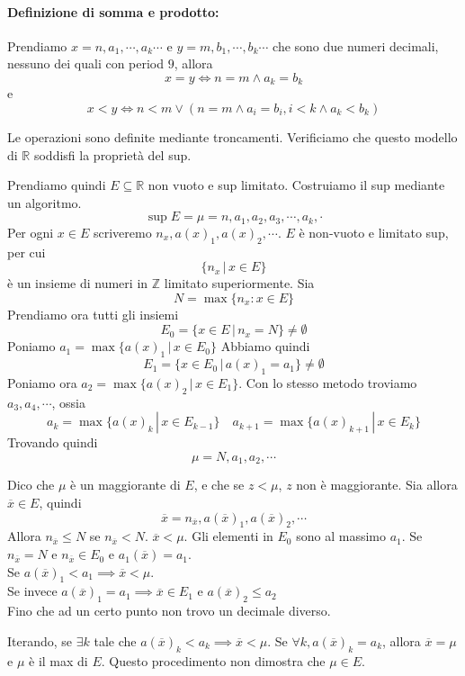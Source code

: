 \documentclass[a4paper]{article}
\begin{document}
\paragraph{Definizione di somma e prodotto:}

Prendiamo \(x = n,a_1,\cdots,a_k\cdots\) e \(y = m,b_1,\cdots,b_k\cdots\)
che sono due numeri decimali, nessuno dei quali con period \(9\),
allora
\[
    x=y \iff n=m \land a_k=b_k
\]
e
\[
    x<y \iff n < m \lor (n=m \land a_i = b_i, i < k \land a_k < b_k)
\]

Le operazioni sono definite mediante troncamenti.
Verificiamo che questo modello di \(\mathbb{R}\) soddisfi la proprietà del sup.

Prendiamo quindi  \(E\subseteq \mathbb{R}\) non vuoto e sup limitato. Costruiamo
il sup mediante un algoritmo.
\[
    \sup E = \mu = n,a_1,a_2,a_3,\cdots,a_k,\cdot
\]
Per ogni \(x\in E\) scriveremo \(n_x,a(x)_1, a(x)_2,\cdots\).
\(E\) è non-vuoto e limitato sup, per cui
\[
    \{ n_x \,|\, x\in E \}
\]
è un insieme di numeri in \(\mathbb{Z}\) limitato superiormente.
Sia
\[
    N = \max\{ n_x \colon x \in E \}
\]
Prendiamo ora tutti gli insiemi
\[
    E_0 = \{ x\in E \,|\, n_x = N \} \neq \emptyset
\]
Poniamo \(a_1 = \max \{ a(x)_1 \,|\, x \in E_0 \}\)
Abbiamo quindi
\[
    E_1 = \{ x \in E_0 \,|\, a(x)_1 = a_1 \} \neq \emptyset
\]
Poniamo ora \(a_2 = \max \{ a(x)_2 \,|\, x \in E_1 \}\).
Con lo stesso metodo troviamo \(a_3, a_4, \cdots\), ossia
\[
    a_k = \max \{ a(x)_k \,|\, x \in E_{k-1} \} \quad a_{k+1} = \max\{ a(x)_{k+1} \,|\, x \in E_k \}
\]
Trovando quindi
\[
    \mu = N,a_1,a_2,\cdots
\]

Dico che \(\mu\) è un maggiorante di \(E\), e che se \(z<\mu\), \(z\) non è maggiorante.
Sia allora \(\overline{x} \in E\), quindi
\[
    \overline{x} = n_{\overline{x}}, a(\overline{x})_1, a(\overline{x})_2, \cdots
\]
Allora \(n_{\overline{x}}\leq N\) se \(n_{\overline{x}} < N\). \(\overline{x} < \mu\).
Gli elementi in \(E_0\) sono al massimo \(a_1\).
Se \(n_{\overline{x}} = N\) e \(n_{\overline{x}} \in E_0\) e \(a_1(\overline{x}) = a_1\). \\
Se \(a(\overline{x})_1 < a_1 \implies \overline{x} < \mu\).\\
Se invece \(a(\overline{x})_1=a_1 \implies \overline{x} \in E_1\) e \(a(\overline{x})_2 \leq a_2\) \\
Fino che ad un certo punto non trovo un decimale diverso.

Iterando, se \(\exists k\) tale che \(a(\overline{x})_k < a_k \implies \overline{x} < \mu\).
Se \(\forall k, a(\overline{x})_k = a_k\), allora \(\overline{x} = \mu\) e \(\mu\) è il max di \(E\).
Questo procedimento non dimostra che \(\mu \in E\).
\end{document}
